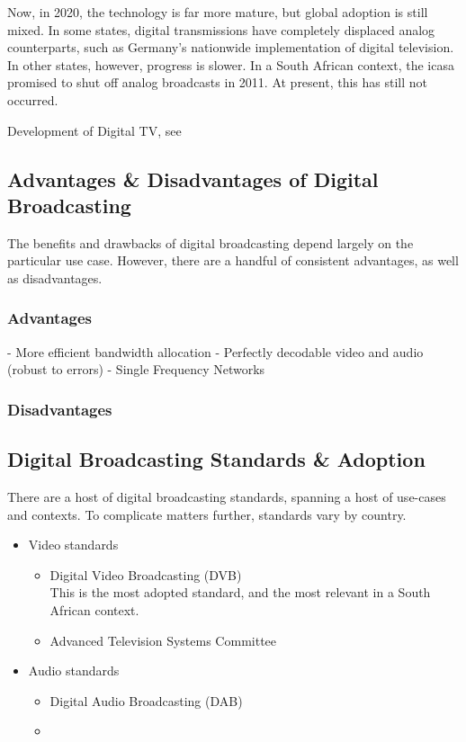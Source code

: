\documentclass[class=report,11pt,crop=false]{standalone}
\begin{document}
Now, in 2020, the technology is far more mature, but global adoption is still mixed. In some states, digital transmissions have completely displaced analog counterparts, such as Germany's nationwide implementation of digital television. In other states, however, progress is slower. In a South African context, the \gls{icasa} promised to shut off analog broadcasts in 2011. At present, this has still not occurred.

Development of Digital TV, see~\cite{Wu2006}

\subsection{Advantages \& Disadvantages of Digital Broadcasting}
The benefits and drawbacks of digital broadcasting depend largely on the particular use case. However, there are a handful of consistent advantages, as well as disadvantages.

\subsubsection{Advantages}
- More efficient bandwidth allocation
- Perfectly decodable video and audio (robust to errors)
- Single Frequency Networks

\subsubsection{Disadvantages}

\subsection{Digital Broadcasting Standards \& Adoption}
There are a host of digital broadcasting standards, spanning a host of use-cases and contexts. To complicate matters further, standards vary by country.

\begin{itemize}
    \item Video standards
        \begin{itemize}
            \item Digital Video Broadcasting (DVB) \\
            This is the most adopted standard, and the most relevant in a South African context.
            \item Advanced Television Systems Committee
        \end{itemize}
    \item Audio standards
        \begin{itemize}
            \item Digital Audio Broadcasting (DAB) \\
            \item 
        \end{itemize}
\end{itemize}
\end{document}
